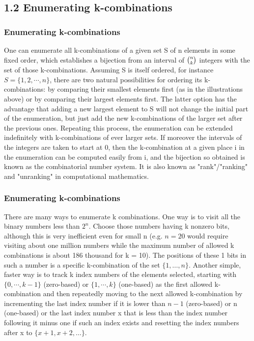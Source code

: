 \documentclass{beamer}
\begin{document}
\subsection{1.2 Enumerating k-combinations}
\begin{frame}
\frametitle{Enumerating k-combinations}
One can enumerate all k-combinations of a given set S of n elements in some fixed order, which establishes a bijection from an interval of ${\tbinom{n}{k}}$ integers with the set of those k-combinations. Assuming S is itself ordered, for instance $S = \{ 1, 2, \cdots, n \}$, there are two natural possibilities for ordering its k-combinations: by comparing their smallest elements first (as in the illustrations above) or by comparing their largest elements first. The latter option has the advantage that adding a new largest element to S will not change the initial part of the enumeration, but just add the new k-combinations of the larger set after the previous ones. Repeating this process, the enumeration can be extended indefinitely with k-combinations of ever larger sets. If moreover the intervals of the integers are taken to start at 0, then the k-combination at a given place i in the enumeration can be computed easily from i, and the bijection so obtained is known as the combinatorial number system. It is also known as "rank"/"ranking" and "unranking" in computational mathematics.\\
\end{frame}

\begin{frame}
\frametitle{Enumerating k-combinations}
There are many ways to enumerate k combinations. One way is to visit all the binary numbers less than $2^n$. Choose those numbers having k nonzero bits, although this is very inefficient even for small n (e.g. $ n = 20$ would require visiting about one million numbers while the maximum number of allowed k combinations is about 186 thousand for k = 10). The positions of these 1 bits in such a number is a specific k-combination of the set $\{ 1, …, n \}$. Another simple, faster way is to track k index numbers of the elements selected, starting with $\{ 0,\cdots, k-1\}$ (zero-based) or $\{1,\cdots ,k\}$ (one-based) as the first allowed k-combination and then repeatedly moving to the next allowed k-combination by incrementing the last index number if it is lower than $n-1$ (zero-based) or n (one-based) or the last index number x that is less than the index number following it minus one if such an index exists and resetting the index numbers after x to $\{x+1, x+2, …\}$.
\end{frame}
\end{document}
